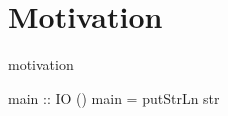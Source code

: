 \section{Motivation}
\label{sec:motivation}

motivation

\begin{code}
main :: IO ()
main = putStrLn str
\end{code}
